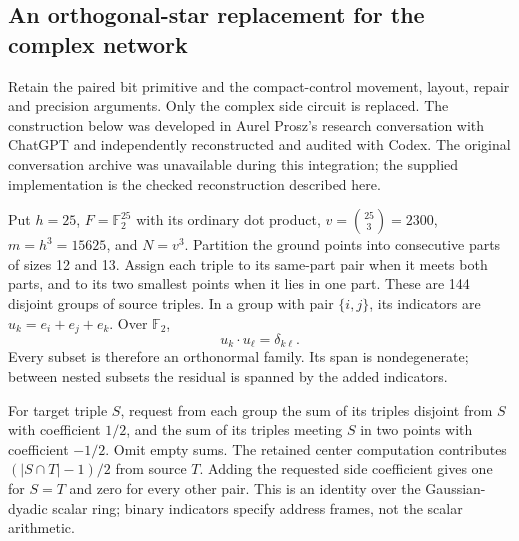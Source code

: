 \subsection{An orthogonal-star replacement for the complex network}
\label{sec:orthogonal-star}
Retain the paired bit primitive and the compact-control movement, layout,
repair and precision arguments. Only the complex side circuit is replaced.
The construction below was developed in Aurel Prosz's research conversation
with ChatGPT and independently reconstructed and audited with Codex. The
original conversation archive was unavailable during this integration;
the supplied implementation is the checked reconstruction described here.

Put $h=25$, $F=\mathbb F_2^{25}$ with its ordinary dot product,
$v=\binom{25}{3}=2300$, $m=h^3=15625$, and $N=v^3$.
Partition the ground points into consecutive parts of sizes 12 and 13.
Assign each triple to its same-part pair when it meets both parts, and to
its two smallest points when it lies in one part. These are 144 disjoint
groups of source triples. In a group with pair $\{i,j\}$, its indicators are
$u_k=e_i+e_j+e_k$. Over $\mathbb F_2$,
\[
 u_k\cdot u_\ell=\delta_{k\ell}.
\]
Every subset is therefore an orthonormal family. Its span is nondegenerate;
between nested subsets the residual is spanned by the added indicators.

For target triple $S$, request from each group the sum of its triples
disjoint from $S$ with coefficient $1/2$, and the sum of its triples meeting
$S$ in two points with coefficient $-1/2$. Omit empty sums. The retained
center computation contributes $(|S\cap T|-1)/2$ from source $T$.
Adding the requested side coefficient gives one for $S=T$ and zero for every
other pair. This is an identity over the Gaussian-dyadic scalar ring;
binary indicators specify address frames, not the scalar arithmetic.

